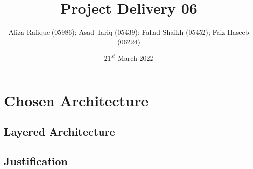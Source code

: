 \documentclass[11pt]{extarticle}
\title{\textbf{Project Delivery 06}}
\author{Aliza Rafique (05986); Asad Tariq (05439); Fahad Shaikh (05452); Faiz Haseeb (06224)}
\date{$21^{st}$ March 2022}
\begin{document}

\newpage
\thispagestyle{empty}
\tableofcontents
\newpage
\pagestyle{plain}

\section{Chosen Architecture}

\subsection{Layered Architecture}

\subsection{Justification}
\end{document}
